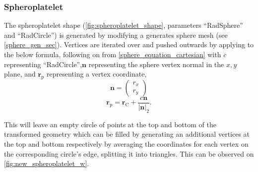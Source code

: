 \subsubsection{Spheroplatelet}
The spheroplatelet shape (\cref{fig:spheroplatelet_shape}, parameters ``RadSphere'' and ``RadCircle'') is generated by modifying a generates sphere mesh (see \cref{sphere_gen_sec}). Vertices are iterated over and pushed outwards by applying to the below formula, following on from \cref{sphere_equation_cartesian} with $c$ representing ``RadCircle'',$\mathbf{n}$ representing the sphere vertex normal in the $x,y$ plane, and $\mathbf{r}_\mathrm{p}$ representing a vertex coordinate,
\begin{equation}
\mathbf{n}=\begin{pmatrix}
  r_x\\
  r_y
\end{pmatrix}
\end{equation}
\begin{equation}
\mathbf{r}_\mathrm{p}=\mathbf{r}_\mathrm{C} + \frac{c\mathbf{n}}{|\mathbf{n}|_2}.
\end{equation}

This will leave an empty circle of points at the top and bottom of the transformed geometry which can be filled by generating an additional vertices at the top and bottom respectively by averaging the coordinates for each vertex on the corresponding circle's edge, splitting it into triangles. This can be observed on \cref{fig:new_spheroplatelet_w}.

